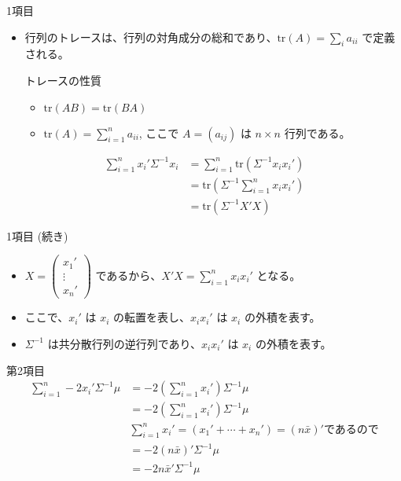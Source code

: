 \documentclass[aspectratio=169]{beamer}
\begin{document}
\begin{frame}{1項目}
    \begin{itemize}
        \item 行列のトレースは、行列の対角成分の総和であり、$\text{tr}(A) = \sum_{i} a_{ii}$ で定義される。     \begin{block}{トレースの性質}
            \begin{itemize}
                \item $\text{tr}(AB) = \text{tr}(BA)$
                \item $\text{tr}(A) = \sum_{i=1}^{n} a_{ii}$, ここで $A = (a_{ij})$ は $n \times n$ 行列である。
            \end{itemize}
        \end{block}
    \end{itemize}
    \begin{align*}
    \sum_{i=1}^n x_i'\Sigma^{-1}x_i &= \sum_{i=1}^n \text{tr}\left(\Sigma^{-1} x_i x_i'\right) \\
    &= \text{tr}\left(\Sigma^{-1} \sum_{i=1}^n x_i x_i'\right) \\
    &= \text{tr}(\Sigma^{-1} X'X)
    \end{align*}
\end{frame}
\begin{frame}{1項目 (続き)} %
    \begin{itemize}
        \item $X=\begin{pmatrix}x_1' \\ \vdots \\ x_n'\end{pmatrix}$ であるから、$X'X = \sum_{i=1}^n x_ix_i'$ となる。
        \item ここで、$x_i'$ は $x_i$ の転置を表し、$x_ix_i'$ は $x_i$ の外積を表す。
        \item $\Sigma^{-1}$ は共分散行列の逆行列であり、$x_ix_i'$ は $x_i$ の外積を表す。        
    \end{itemize}
\end{frame}
\begin{frame}{第2項目}
    \begin{align*}
    \sum_{i=1}^n -2x_i'\Sigma^{-1}\mu 
    &= -2(\sum_{i=1}^n x_i') \Sigma^{-1} \mu \\
    &= -2\left(\sum_{i=1}^n x_i'\right) \Sigma^{-1} \mu \\
    &\sum_{i=1}^n x_i' =  (x_1' + \cdots + x_n') = (n\bar{x})'\text{であるので} \\
    &= -2 (n\bar{x})' \Sigma^{-1} \mu \\
    &= -2 n\bar{x}' \Sigma^{-1} \mu \\
    \end{align*}
\end{frame}
\end{document}
